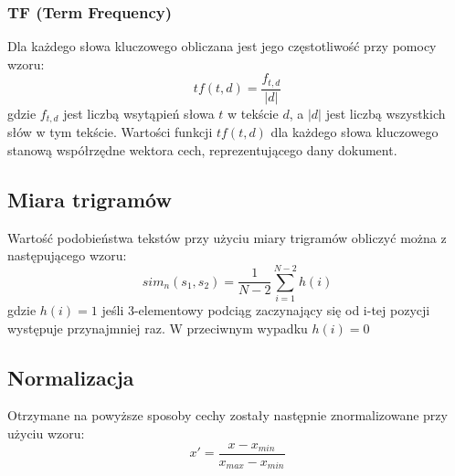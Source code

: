 \documentclass{classrep}
\begin{document}
\subsubsection{TF (Term Frequency)  \cite{TF_TF-IDF}}
Dla każdego słowa kluczowego obliczana jest jego częstotliwość przy pomocy wzoru: 
\begin{equation}
tf(t,d) =  \frac{f_{t,d}}{|d|} 
\end{equation}
gdzie \(f_{t,d}\) jest liczbą wsytąpień słowa \(t\) w tekście \(d\), a \(|d|\) jest liczbą wszystkich słów w tym tekście. Wartości funkcji \(tf(t,d)\) dla każdego słowa kluczowego stanową współrzędne wektora cech, reprezentującego dany dokument.

\subsection{Miara trigramów \cite{ANiewSkrypt}} 
Wartość podobieństwa tekstów przy użyciu miary trigramów obliczyć można z następującego wzoru:
\begin{equation}
sim_{n}(s_{1}, s_{2}) = \frac{1}{N-2}\sum_{i=1}^{N-2}h(i)
\end{equation}
 gdzie \(h(i) = 1\) jeśli 3-elementowy podciąg zaczynający się od i-tej pozycji występuje przynajmniej raz. W przeciwnym wypadku \(h(i) = 0\)

\subsection{Normalizacja \cite{MLWiki}}
Otrzymane na powyższe sposoby cechy zostały następnie znormalizowane przy użyciu wzoru:
\begin{equation}
x' = \frac{x-x_{min}}{x_{max}-x_{min}} 
\end{equation}
\end{document}
